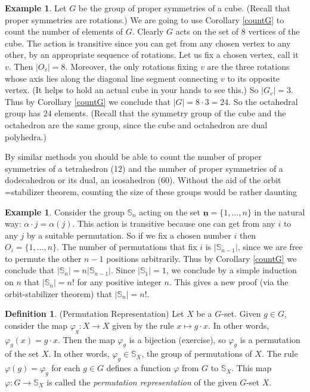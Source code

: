 \documentclass[11pt,oneside]{article}
\theoremstyle{definition}
\newtheorem{defn}[thm]{Definition}
\newtheorem{example}[thm]{Example}
\newcommand{\n}{\underline{\mathbf{n}}}
\newcommand{\Sym}{\mathbb{S}}
\begin{document}
\begin{example} 
Let $G$ be the group of proper symmetries of a cube. (Recall that
proper symmetries are rotations.)  We are going to use Corollary
\ref{countG} to count the number of elements of $G$. Clearly $G$ acts
on the set of 8 vertices of the cube. The action is transitive since
you can get from any chosen vertex to any other, by an appropriate
sequence of rotations. Let us fix a chosen vertex, call it $v$. Then
$|O_v|=8$.  Moreover, the only rotations fixing $v$ are the three
rotations whose axis lies along the diagonal line segment connecting
$v$ to its opposite vertex. (It helps to hold an actual cube in your
hands to see this.) So $|G_v|=3$. Thus by Corollary \ref{countG} we
conclude that $|G| = 8\cdot 3 = 24$. So the octahedral group has $24$
elements. (Recall that the symmetry group of the cube and the
octahedron are the same group, since the cube and octahedron are dual
polyhedra.)

By similar methods you should be able to count the number of proper
symmetries of a tetrahedron (12) and the number of proper symmetries
of a dodecahedron or its dual, an icosahedron (60). Without the aid of
the orbit =stabilizer theorem, counting the size of these groups would
be rather daunting
\end{example}



\begin{example} 
Consider the group $\Sym_n$ acting on the set $\n = \{1, \dots, n \}$
in the natural way: $\alpha \cdot j = \alpha(j)$.  This action is
transitive because one can get from any $i$ to any $j$ by a suitable
permutation. So if we fix a chosen number $i$ then $O_i = \{1,\dots,
n\}$. The number of permutations that fix $i$ is $|\Sym_{n-1}|$, since
we are free to permute the other $n-1$ positions arbitrarily. Thus by
Corollary \ref{countG} we conclude that $|\Sym_n|=n
|\Sym_{n-1}|$. Since $|\Sym_1|=1$, we conclude by a simple induction
on $n$ that $|\Sym_n| = n!$ for any positive integer $n$. This gives a
new proof (via the orbit-stabilizer theorem) that $|\Sym_n| = n!$.
\end{example}



\begin{defn} (Permutation Representation)
\label{permrep}%
Let $X$ be a $G$-set. Given $g \in G$, consider the map $\varphi_g: X
\to X$ given by the rule $x \mapsto g\cdot x$. In other words,
$\varphi_g(x) = g\cdot x$.  Then the map $\varphi_g$ is a bijection
(exercise), so $\varphi_g$ is a permutation of the set $X$.  In other
words, $\varphi_g \in \Sym_X$, the group of permutations of $X$.  The
rule $\varphi(g) = \varphi_g$ for each $g\in G$ defines a function
$\varphi$ from $G$ to $\Sym_X$.  This map $\varphi \colon G \to
\Sym_X$ is called the \emph{permutation representation} of the given
$G$-set $X$.
\end{defn}
\end{document}
